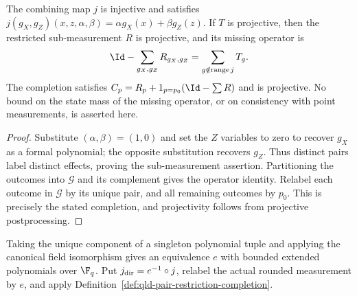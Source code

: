 \begin{lemma}
	\label{lem:qld-combined-pair-completion}
	\leanok
	The combining map $j$ is injective and satisfies
	$j(g_X,g_Z)(x,z,\alpha,\beta)=\alpha g_X(x)+\beta g_Z(z)$.
	If $T$ is projective, then the restricted sub-measurement $R$ is projective,
	and its missing operator is
	\[
		\Id-\sum_{g_X,g_Z}R_{g_X,g_Z}=\sum_{g\notin\operatorname{range}j}T_g.
	\]
	The completion satisfies $C_p=R_p+1_{p=p_0}(\Id-\sum R)$ and is projective.
	No bound on the state mass of the missing operator, or on consistency with
	point measurements, is asserted here.
\end{lemma}
\begin{proof}
	\leanok
	Substitute $(\alpha,\beta)=(1,0)$ and set the $Z$ variables to zero
	to recover $g_X$ as a formal polynomial; the opposite substitution
	recovers $g_Z$. Thus distinct pairs label distinct effects, proving
	the sub-measurement assertion. Partitioning the outcomes into
	$\mathcal G$ and its complement gives the operator identity.
	Relabel each outcome in $\mathcal G$ by its unique pair, and all
	remaining outcomes by $p_0$. This is precisely the stated completion,
	and projectivity follows from projective postprocessing.
\end{proof}

\begin{definition}
	\label{def:qld-direct-pair-completion}
	\leanok
	Taking the unique component of a singleton polynomial tuple and applying the
	canonical field isomorphism gives an equivalence $e$ with bounded extended
	polynomials over $\F_q$. Put $j_{\rm dir}=e^{-1}\circ j$, relabel the actual
	rounded measurement by $e$, and apply
	Definition~\ref{def:qld-pair-restriction-completion}.
\end{definition}

